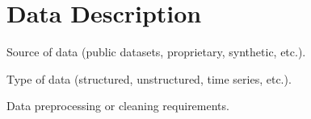 \section{Data Description}
 Source of data (public datasets, proprietary, synthetic, etc.).
 
Type of data (structured, unstructured, time series, etc.).

Data preprocessing or cleaning requirements.
